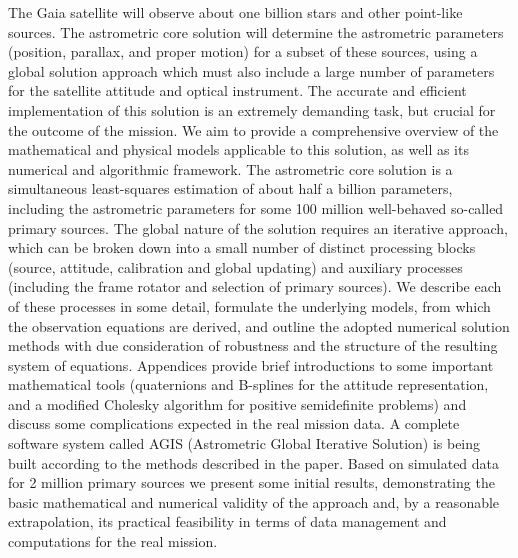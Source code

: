 \documentclass[structabstract]{aa}
\begin{document}
\abstract
{The Gaia satellite will observe about one billion stars and other point-like
sources. The astrometric core solution will determine the astrometric 
parameters (position, parallax, and proper motion) for a subset of these
sources, using a global solution approach which must also include a
large number of parameters for the satellite attitude and optical instrument. 
The accurate and efficient implementation of this solution is an extremely 
demanding task, but crucial for the outcome of the mission.}
{We aim to provide a comprehensive overview of the mathematical and physical
models applicable to this solution, as well as its numerical and algorithmic 
framework.
}
{The astrometric core solution is a simultaneous least-squares estimation
of about half a billion parameters, including the astrometric parameters
for some 100 million well-behaved so-called primary sources. The global nature of the 
solution requires an iterative approach, which can be broken down into a 
small number of distinct processing blocks (source, attitude, calibration 
and global updating) and auxiliary processes (including the frame rotator and selection
of primary sources). We describe each of these processes in some detail, 
formulate the underlying models, from which the observation
equations are derived, and outline the adopted numerical solution methods with due 
consideration of robustness and the structure of the resulting system of
equations. Appendices provide brief introductions to some 
important mathematical tools (quaternions and B-splines for the attitude 
representation, and a modified Cholesky algorithm for positive semidefinite problems)
and discuss some complications expected in the real mission data.}
{A complete software system called AGIS (Astrometric Global Iterative
Solution) is being built according to the methods described in the paper.
Based on simulated data for 2 million primary sources we present some 
initial results, demonstrating the 
basic mathematical and numerical validity of the approach and, 
by a reasonable extrapolation, its practical feasibility in terms of data 
management and computations for the real mission.}
{}


\maketitle
\end{document}
